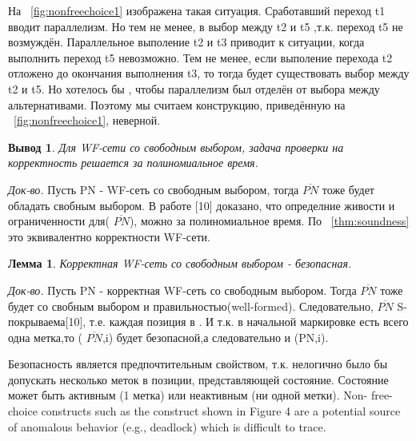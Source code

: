 \documentclass[a4paper,14pt]{article}
\newtheorem{lemma}{Лемма}
\newtheorem{corollary}{Вывод}
\begin{document}
На ~\cref{fig:nonfreechoice1} изображена такая ситуация. Сработавший переход t1 вводит параллелизм. Но тем не менее, в выбор между t2 и t5 ,т.к. переход t5 не возмуждён. Параллельное выполение t2 и t3 приводит к ситуации, когда выполнить переход t5 невозможно. Тем не менее, если выполение перехода t2 отложено до окончания выполнения t3, то тогда будет существовать выбор между t2 и t5. Но хотелось бы , чтобы параллелизм был отделён от выбора между альтернативами. Поэтому мы считаем конструкцию, приведённую на ~\cref{fig:nonfreechoice1}, неверной.



\begin{corollary}\label{crl:freechoicesoundness}
Для WF-сети со свободным выбором, задача проверки на корректность решается за полиномиальное время. 
\end{corollary}
\textit{Док-во.} Пусть PN - WF-сеть со свободным выбором, тогда $\overline{PN}$ тоже будет обладать  свобным выбором.  В работе [10] доказано, что определние живости и ограниченности для( $\overline{PN}$), можно за полиномиальное время. По ~\cref{thm:soundness} это эквивалентно корректности WF-сети.


\begin{lemma}
Корректная WF-сеть со свободным выбором - безопасная.
\end{lemma}
\textit{Док-во.} Пусть PN - корректная WF-сеть со свободным выбором. Тогда $\overline{PN}$ тоже будет со свобным выбором и правильностью(well-formed). Следовательно, $\overline{PN}$ S-покрываема[10], т.е. каждая позиция в . И т.к. в начальной маркировке есть всего одна метка,то ( $\overline{PN}$,i) будет безопасной,а следовательно и (PN,i).



Безопасность является предпочтительным свойством, т.к. нелогично было бы допускать несколько меток в позиции, представляющей состояние. Состояние может быть активным (1 метка) или неактивным (ни одной метки). 
 Non-
free-choice constructs such as the construct shown in Figure 4 are a potential source of
anomalous behavior (e.g., deadlock) which is difficult to trace.
\end{document}

